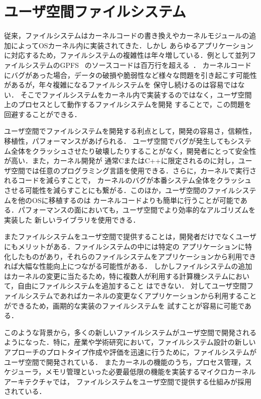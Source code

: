 \documentclass[a4paper，11pt]{jreport}
\begin{document}
\section{ユーザ空間ファイルシステム}
従来，ファイルシステムはカーネルコードの書き換えやカーネルモジュールの追加によってOSカーネル内に実装されてきた．しかし
あらゆるアプリケーションに対応するため，ファイルシステムの複雑性は年々増している．例として並列ファイルシステムのGPFS~\cite{270722}
のソースコードは百万行を超える~\cite{3149376}．
カーネルコードにバグがあった場合，データの破損や脆弱性など様々な問題を引き起こす可能性があるが，年々複雑になるファイルシステムを
保守し続けるのは容易ではない．
そこでファイルシステムをカーネル内で実装するのではなく，ユーザ空間上のプロセスとして動作するファイルシステムを開発
することで，この問題を回避することができる．

ユーザ空間でファイルシステムを開発する利点として，開発の容易さ，信頼性，移植性，パフォーマンスがあげられる．
ユーザ空間でバグが発生してもシステム全体をクラッシュさせたり破壊したりすることがなく，開発者にとって安全性が高い．また，カーネル開発が
通常CまたはC++に限定されるのに対し，ユーザ空間では任意のプログラミング言語を使用できる．さらに，カーネルで実行されるコードを減らすことで，
カーネルのバグが本番システム全体をクラッシュさせる可能性を減らすことにも繋がる．このほか，ユーザ空間のファイルシステムを他のOSに移植するのは
カーネルコードよりも簡単に行うことが可能である．パフォーマンスの面においても，ユーザ空間でより効率的なアルゴリズムを実装した
新しいライブラリを使用できる．

またファイルシステムをユーザ空間で提供することは，開発者だけでなくユーザにもメリットがある．ファイルシステムの中には特定の
アプリケーションに特化したものがあり，それらのファイルシステムをアプリケーションから利用できれば大幅な性能向上につながる可能性がある．
しかしファイルシステムの追加はカーネルの変更に当たるため，特に複数人が利用する計算機システムにおいて，自由にファイルシステムを追加すること
はできない．
対してユーザ空間ファイルシステムであればカーネルの変更なくアプリケーションから利用することができるため，画期的な実装のファイルシステムを
試すことが容易に可能である．

このような背景から，多くの新しいファイルシステムがユーザ空間で開発されるようになった．特に，産業や学術研究において，ファイルシステム設計の新しいアプローチのプロトタイプ作成や評価を迅速に行うために，ファイルシステムが
ユーザ空間で開発されている．
またカーネルの機能のうち，プロセス管理，スケジューラ，メモリ管理といった必要最低限の機能を実装するマイクロカーネルアーキテクチャでは，
ファイルシステムをユーザ空間で提供する仕組みが採用されている．
\end{document}
